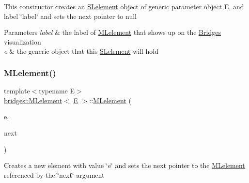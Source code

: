 This constructor creates an \mbox{\hyperlink{classbridges_1_1_s_lelement}{S\+Lelement}} object of generic parameter object E, and label \char`\"{}label\char`\"{} and sets the next pointer to null


\begin{DoxyParams}{Parameters}
{\em label} & the label of \mbox{\hyperlink{classbridges_1_1_m_lelement}{M\+Lelement}} that shows up on the \mbox{\hyperlink{classbridges_1_1_bridges}{Bridges}} visualization \\
\hline
{\em e} & the generic object that this \mbox{\hyperlink{classbridges_1_1_s_lelement}{S\+Lelement}} will hold \\
\hline
\end{DoxyParams}
\mbox{\label{classbridges_1_1_m_lelement_aaab4924754f94138bb110efd4c047411}} 
\subsubsection{\texorpdfstring{MLelement()}{MLelement()}\hspace{0.1cm}{\footnotesize\ttfamily [3/3]}}
{\footnotesize\ttfamily template$<$typename E$>$ \\
\mbox{\hyperlink{classbridges_1_1_m_lelement}{bridges\+::\+M\+Lelement}}$<$ \mbox{\hyperlink{namespacebridges_acfb0a4f7877d8f63de3e6862004c50eda3a3ea00cfc35332cedf6e5e9a32e94da}{E}} $>$\+::\mbox{\hyperlink{classbridges_1_1_m_lelement}{M\+Lelement}} (\begin{DoxyParamCaption}\item[{\mbox{\hyperlink{namespacebridges_acfb0a4f7877d8f63de3e6862004c50eda3a3ea00cfc35332cedf6e5e9a32e94da}{E}}}]{e,  }\item[{\mbox{\hyperlink{classbridges_1_1_m_lelement}{M\+Lelement}}$<$ \mbox{\hyperlink{namespacebridges_acfb0a4f7877d8f63de3e6862004c50eda3a3ea00cfc35332cedf6e5e9a32e94da}{E}} $>$ $\ast$}]{next }\end{DoxyParamCaption})\hspace{0.3cm}{\ttfamily [inline]}}

Creates a new element with value \char`\"{}e\char`\"{} and sets the next pointer to the \mbox{\hyperlink{classbridges_1_1_m_lelement}{M\+Lelement}} referenced by the \char`\"{}next\char`\"{} argument



